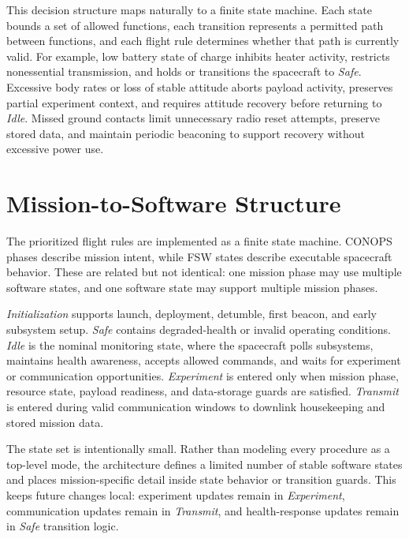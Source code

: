 \documentclass[10pt,letterpaper,twoside,fleqn]{article}
\newcommand{\Indent}{\hspace*{4\fontdimen2\font}}
\begin{document}
This decision structure maps naturally to a finite state machine. Each state bounds a set of allowed functions, each transition represents a permitted path between functions, and each flight rule determines whether that path is currently valid. For example, low battery state of charge inhibits heater activity, restricts nonessential transmission, and holds or transitions the spacecraft to \textit{Safe}. Excessive body rates or loss of stable attitude aborts payload activity, preserves partial experiment context, and requires attitude recovery before returning to \textit{Idle}. Missed ground contacts limit unnecessary radio reset attempts, preserve stored data, and maintain periodic beaconing to support recovery without excessive power use.
\vspace{32pt}
\section{Mission-to-Software Structure}

\Indent
The prioritized flight rules are implemented as a finite state machine. CONOPS phases describe mission intent, while FSW states describe executable spacecraft behavior. These are related but not identical: one mission phase may use multiple software states, and one software state may support multiple mission phases.

\Indent
\textit{Initialization} supports launch, deployment, detumble, first beacon, and early subsystem setup. \textit{Safe} contains degraded-health or invalid operating conditions. \textit{Idle} is the nominal monitoring state, where the spacecraft polls subsystems, maintains health awareness, accepts allowed commands, and waits for experiment or communication opportunities. \textit{Experiment} is entered only when mission phase, resource state, payload readiness, and data-storage guards are satisfied. \textit{Transmit} is entered during valid communication windows to downlink housekeeping and stored mission data.

The state set is intentionally small. Rather than modeling every procedure as a top-level mode, the architecture defines a limited number of stable software states and places mission-specific detail inside state behavior or transition guards. This keeps future changes local: experiment updates remain in \textit{Experiment}, communication updates remain in \textit{Transmit}, and health-response updates remain in \textit{Safe} transition logic.
\end{document}
